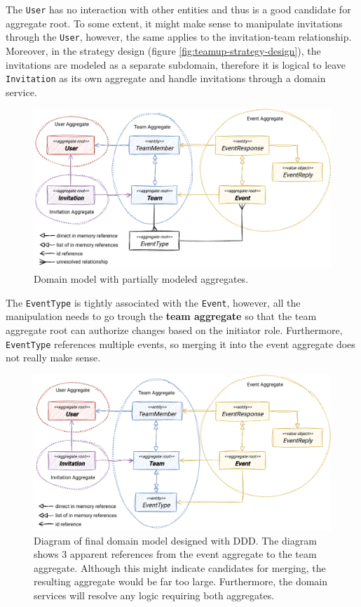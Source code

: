 The \texttt{User} has no interaction with other entities and thus is a good candidate for aggregate root. To some extent, it might make sense to manipulate invitations through the \texttt{User}, however, the same applies to the invitation-team relationship. Moreover, in the strategy design (figure \ref{fig:teamup-strategy-design}), the invitations are modeled as a separate subdomain, therefore it is logical to leave \texttt{Invitation} as its own aggregate and handle invitations through a domain service.

\begin{figure} [H]
    \centering
    \includegraphics[width=\textwidth]{figures/domain-aggregates-2.pdf}
    \caption{Domain model with partially modeled aggregates.}
    \label{fig:domain_aggregates_2}
\end{figure}

The \texttt{EventType} is tightly associated with the \texttt{Event}, however, all the manipulation needs to go trough the \textbf{team aggregate} so that the team aggregate root can authorize changes based on the initiator role. Furthermore, \texttt{EventType} references multiple events, so merging it into the event aggregate does not really make sense.

\begin{figure} [H]
    \centering
    \includegraphics[width=\textwidth]{figures/domain-aggregates-3.pdf}
    \caption{Diagram of final domain model designed with DDD. The diagram shows 3 apparent references from the event aggregate to the team aggregate. Although this might indicate candidates for merging, the resulting aggregate would be far too large. Furthermore, the domain services will resolve any logic requiring both aggregates.}
    \label{fig:domain_aggregates_3}
\end{figure}

